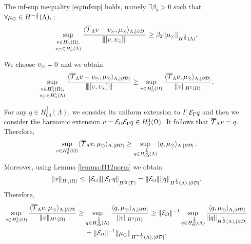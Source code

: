 \begin{lemma}
The inf-sup inequality \eqref{eq:infsup} holds, namely $ \exists \beta_2 >0$ such that $\forall \mu_{\odot} \in H^{-\frac 12}(\Lambda),\,$:
\begin{equation*}
\sup _{\substack{v\in H^1_0(\Omega),\\ v_{\odot} \in H^1_0(\Lambda)}} \frac{ \langle {\overline{\mathcal{T}}_\Lambda} v - v_{\odot}, \mu_{\odot} \rangle_{\Lambda,|\partial\mathcal{D}|}}{{\left\vert\kern-0.25ex\left\vert\kern-0.25ex\left\vert [v,v_{\odot}] \right\vert\kern-0.25ex\right\vert\kern-0.25ex\right\vert}}
\geq \beta_2 \|\mu_{\odot}\|_{H^{\frac 12}(\Lambda)}.
\end{equation*}
\end{lemma} 
We choose $v_{\odot}=0$ and we obtain
\begin{equation*}
\sup _{\substack{v\in H^1_0(\Omega),\\ v_{\odot} \in H^1_0(\Lambda)}} \frac{ \langle {\overline{\mathcal{T}}_\Lambda} v - v_{\odot}, \mu_{\odot} \rangle_{\Lambda,|\partial\mathcal{D}|}}{{\left\vert\kern-0.25ex\left\vert\kern-0.25ex\left\vert [v,v_{\odot}] \right\vert\kern-0.25ex\right\vert\kern-0.25ex\right\vert}}
\geq \sup _{v\in H^1_0(\Omega)} \frac{ \langle {\overline{\mathcal{T}}_\Lambda} v, \mu_{\odot} \rangle_{\Lambda,|\partial\mathcal{D}|}}{\|v\|_{H^1(\Omega)}}. 
\end{equation*}

For any $q \in H^{\frac 12}_{00}(\Lambda)$, we consider its uniform extension to $\Gamma$ $\mathcal{E}_\Gamma q$
and then we consider the harmonic extension $v=\mathcal{E}_\Omega \mathcal{E}_\Gamma q\in H^1_0(\Omega)$. It follows that ${\overline{\mathcal{T}}_\Lambda} v=q$. Therefore, 
\begin{equation*}
\sup _{v\in H^1_0(\Omega)}  \langle {\overline{\mathcal{T}}_\Lambda} v, \mu_{\odot} \rangle_{\Lambda,|\partial\mathcal{D}|} \geq\sup_{q \in H^{\frac 12}_{00}(\Lambda)} \langle q, \mu_{\odot}  \rangle_{\Lambda,|\partial\mathcal{D}|}\,.
\end{equation*}
Moreover, using Lemma \ref{lemma:H12norm} we obtain
\begin{equation*}
\|v\|_{H^1_0(\Omega)}\leq \|\mathcal{E}_\Omega\| \|\mathcal{E}_\Gamma q\|_{H^{\frac 12}(\Gamma)}  = \|\mathcal{E}_\Omega\| \|q\|_{H^{\frac 12}(\Lambda),|\partial\mathcal{D}|}.
\end{equation*}
 Therefore,
\begin{multline*}
\sup _{v\in H^1_0(\Omega)} \frac{ \langle {\overline{\mathcal{T}}_\Lambda} v, \mu_{\odot} \rangle_{\Lambda,|\partial\mathcal{D}|}}{\|v\|_{H^1(\Omega)}}
\geq \sup _{q\in H^{\frac 12}_{00}(\Lambda)} \frac{ \langle q, \mu_{\odot} \rangle_{\Lambda,|\partial\mathcal{D}|}}{\|v\|_{H^1(\Omega)}}
\geq \|\mathcal{E}_\Omega\|^{-1} \sup _{q\in H^{\frac 12}_{00}(\Lambda)} \frac{ \langle q, \mu_{\odot} \rangle_{\Lambda,|\partial\mathcal{D}|}}{\|q\|_{H^{\frac 12}(\Lambda),|\partial\mathcal{D}|}} 
\\= \|\mathcal{E}_\Omega\|^{-1} \|\mu_{\odot}\|_{H^{-\frac 12}(\Lambda),|\partial\mathcal{D}|}.
\end{multline*}



